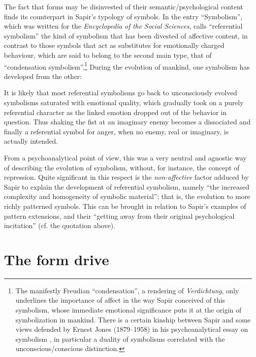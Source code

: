 \documentclass[output=paper]{langscibook}
\begin{document}
The fact that forms may be disinvested of their semantic/psychological content finds its counterpart in Sapir's typology of symbols. In the entry ``Symbolism'', which was written for the \emph{Encyclopedia of the Social Sciences}, \citet{Sapir1934} calls ``referential symbolism'' the kind of symbolism that has been divested of affective content, in contrast to those symbols that act as substitutes for emotionally charged behaviour, which are said to belong to the second main type, that of ``condensation symbolism''.\footnote{The manifestly Freudian ``condensation'', a rendering of \emph{Verdichtung}, only underlines the importance of affect in the way Sapir conceived of this symbolism, whose immediate emotional significance puts it at the origin of symbolization in mankind. There is a certain kinship between Sapir and some views defended by Ernest Jones (1879--1958) in his psychoanalytical essay on symbolism \citep{Jones1916}, in particular a duality of symbolisms correlated with the unconscious/conscious distinction.} During the evolution of mankind, one symbolism has developed from the other: 

\begin{modquote}
It is likely that most referential symbolisms go back to unconsciously evolved symbolisms saturated with emotional quality, which gradually took on a purely referential character as the linked emotion dropped out of the behavior in question. Thus shaking the fist at an imaginary enemy becomes a dissociated and finally a referential symbol for anger, when no enemy, real or imaginary, is actually intended. \citep[565]{Sapir1934}
\end{modquote}

From a psychoanalytical point of view, this was a very neutral and agnostic way of describing the evolution of symbolism, without, for instance, the concept of repression. Quite significant in this respect is the \emph{non-affective} factor adduced by Sapir to explain the development of referential symbolism, namely ``the increased complexity and homogeneity of symbolic material''; that is, the evolution to more richly patterned symbols. This can be brought in relation to Sapir's examples of pattern extensions, and their ``getting away from their original psychological incitation'' (cf. the quotation above). 

\section{The form drive}
\label{sec:fortis:formdrive}
\end{document}
